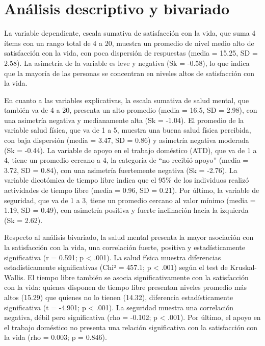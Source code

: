 \documentclass[
  spanish,
  a4paper,
  oneside]{scrbook}
\begin{document}
\section{Análisis descriptivo y
bivariado}\label{anuxe1lisis-descriptivo-y-bivariado}

La variable dependiente, escala sumativa de satisfacción con la vida,
que suma 4 ítems con un rango total de 4 a 20, muestra un promedio de
nivel medio alto de satisfacción con la vida, con poca dispersión de
respuestas (media = 15.25, SD = 2.58). La asimetría de la variable es
leve y negativa (Sk = -0.58), lo que indica que la mayoría de las
personas se concentran en niveles altos de satisfacción con la vida.

En cuanto a las variables explicativas, la escala sumativa de salud
mental, que también va de 4 a 20, presenta un alto promedio (media =
16.5, SD = 2.98), con una asimetría negativa y medianamente alta (Sk =
-1.04). El promedio de la variable salud física, que va de 1 a 5,
muestra una buena salud física percibida, con baja dispersión (media =
3.47, SD = 0.86) y asimetría negativa moderada (Sk = -0.44). La variable
de apoyo en el trabajo doméstico (ATD), que va de 1 a 4, tiene un
promedio cercano a 4, la categoría de ``no recibió apoyo'' (media =
3.72, SD = 0.84), con una asimetría fuertemente negativa (Sk = -2.76).
La variable dicotómica de tiempo libre indica que el 95\% de los
individuos realizó actividades de tiempo libre (media = 0.96, SD =
0.21). Por último, la variable de seguridad, que va de 1 a 3, tiene un
promedio cercano al valor mínimo (media = 1.19, SD = 0.49), con
asimetría positiva y fuerte inclinación hacia la izquierda (Sk = 2.62).

Respecto al análisis bivariado, la salud mental presenta la mayor
asociación con la satisfacción con la vida, una correlación fuerte,
positiva y estadísticamente significativa (r = 0.591; p \textless{}
.001). La salud física muestra diferencias estadísticamente
significativas (Chi² = 457.1; p \textless{} .001) según el test de
Kruskal-Wallis. El tiempo libre también se asocia significativamente con
la satisfacción con la vida: quienes disponen de tiempo libre presentan
niveles promedio más altos (15.29) que quienes no lo tienen (14.32),
diferencia estadísticamente significativa (t = -4.901; p \textless{}
.001). La seguridad muestra una correlación negativa, débil pero
significativa (rho = -0.102; p \textless{} .001). Por último, el apoyo
en el trabajo doméstico no presenta una relación significativa con la
satisfacción con la vida (rho = 0.003; p = 0.846).
\end{document}
